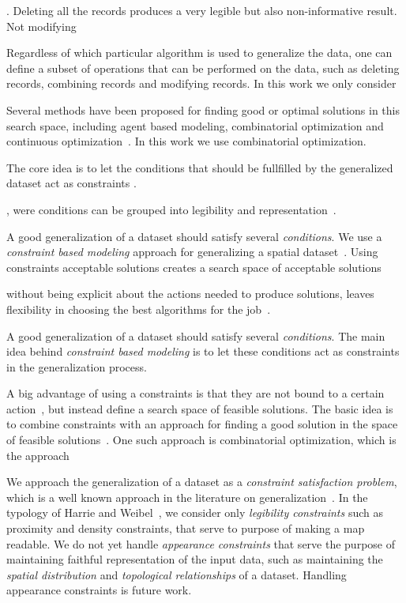 \documentclass[11pt, oneside]{article}   	%
\begin{document}
. Deleting all the records produces a very legible but also non-informative result. Not modifying 



Regardless of which particular algorithm is used to generalize the data, one can define a subset of operations that can be performed on the data, such as deleting records, combining records and modifying records. In this work we only consider

Several methods have been proposed for finding good or optimal solutions in this search space, including agent based modeling, combinatorial optimization and continuous optimization~\cite{harrie2007modelling}. In this work we use combinatorial optimization. 



 The core idea is to let the conditions that should be fullfilled by the generalized dataset act as constraints .


, were conditions can be grouped into legibility and representation~\cite{harrie2007modelling}.




A good generalization of a dataset should satisfy several \emph{conditions}.  We use a \emph{constraint based modeling} approach for generalizing a spatial dataset~\cite{harrie1999constraint}. Using constraints acceptable solutions creates a search space of acceptable solutions

without being explicit about the actions needed to produce solutions, leaves flexibility in choosing the best algorithms for the job~\cite{beard1991constraints}.

A good generalization of a dataset should satisfy several \emph{conditions}. The main idea behind \emph{constraint based modeling} is to let these conditions act as constraints in the generalization process.


 A big advantage of using a constraints is that they are not bound to a certain action~\cite{beard1991constraints}, but instead define a search space of feasible solutions. The basic idea is to combine constraints with an approach for finding a good solution in the space of feasible solutions~\cite{harrie2007modelling}. One such approach is combinatorial optimization, which is the approach 




We approach the generalization of a dataset as a \emph{constraint satisfaction problem}, which is a well known approach in the literature on generalization~\cite{beard1991constraints,harrie1999constraint}. In the typology of Harrie and Weibel~\cite{harrie2007modelling}, we consider only \emph{legibility constraints} such as proximity and density constraints, that serve to purpose of making a map readable. We do not yet handle \emph{appearance constraints} that serve the purpose of maintaining faithful representation of the input data, such as maintaining the \emph{spatial distribution} and \emph{topological relationships} of a dataset. Handling appearance constraints is future work.
\end{document}

